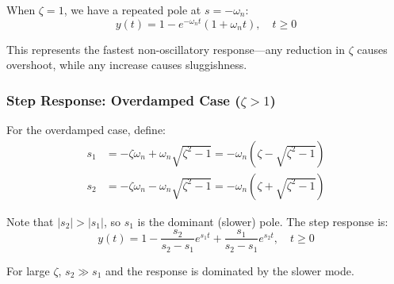 When $\zeta = 1$, we have a repeated pole at $s = -\omega_n$:
\begin{equation}
\boxed{y(t) = 1 - e^{-\omega_n t}(1 + \omega_n t), \quad t \geq 0}
\label{eq:critical_step}
\end{equation}

This represents the fastest non-oscillatory response---any reduction in $\zeta$ causes overshoot, while any increase causes sluggishness.

\subsubsection{Step Response: Overdamped Case ($\zeta > 1$)}

For the overdamped case, define:
\begin{align}
s_1 &= -\zeta\omega_n + \omega_n\sqrt{\zeta^2-1} = -\omega_n(\zeta - \sqrt{\zeta^2-1}) \\
s_2 &= -\zeta\omega_n - \omega_n\sqrt{\zeta^2-1} = -\omega_n(\zeta + \sqrt{\zeta^2-1})
\end{align}

Note that $|s_2| > |s_1|$, so $s_1$ is the dominant (slower) pole. The step response is:
\begin{equation}
\boxed{y(t) = 1 - \frac{s_2}{s_2-s_1}e^{s_1 t} + \frac{s_1}{s_2-s_1}e^{s_2 t}, \quad t \geq 0}
\label{eq:overdamped_step}
\end{equation}

For large $\zeta$, $s_2 \gg s_1$ and the response is dominated by the slower mode.

